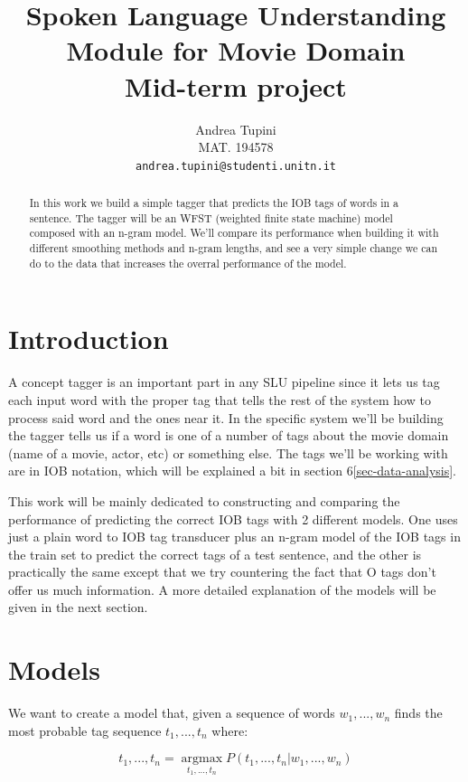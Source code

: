 \documentclass[11pt,a4paper]{article}
\title{Spoken Language Understanding Module for Movie Domain \\ Mid-term project}
\author{Andrea Tupini \\
  MAT.  194578 \\
  {\tt andrea.tupini@studenti.unitn.it}}
\date{}
\begin{document}
	
\maketitle

\begin{abstract}
	
	In this work we build a simple tagger that predicts the IOB tags of words in a sentence. The tagger will be an WFST (weighted finite state machine) model composed with an n-gram model. We'll compare its performance when building it with different smoothing methods and n-gram lengths, and see a very simple change we can do to the data that increases the overral performance of the model. 
	\\
	
\end{abstract}

\section{Introduction}

	A concept tagger is an important part in any SLU pipeline since it lets us tag each input word with the proper tag that tells the rest of the system how to process said word and the ones near it. In the specific system we'll be building the tagger tells us if a word is one of a number of tags about the movie domain (name of a movie, actor, etc) or something else. The tags we'll be working with are in IOB notation, which will be explained a bit in section 6\ref{sec-data-analysis}. 
	
	This work will be mainly dedicated to constructing and comparing the performance of predicting the correct IOB tags with 2 different models. One uses just a plain word to IOB tag transducer plus an n-gram model of the IOB tags in the train set to predict the correct tags of a test sentence, and the other is practically the same except that we try countering the fact that O tags don't offer us much information. A more detailed explanation of the models will be given in the next section.
	

\section{Models}

	We want to create a model that, given a sequence of words $w_1, ... , w_n$ finds the most probable tag sequence $t_1, ... , t_n$ where:
	
	$$
	t_1, ... , t_n = \operatorname*{argmax}_{t_1,...,t_n} P(t_1,...,t_n | w_1,...,w_n)
	$$
	
\end{document}
